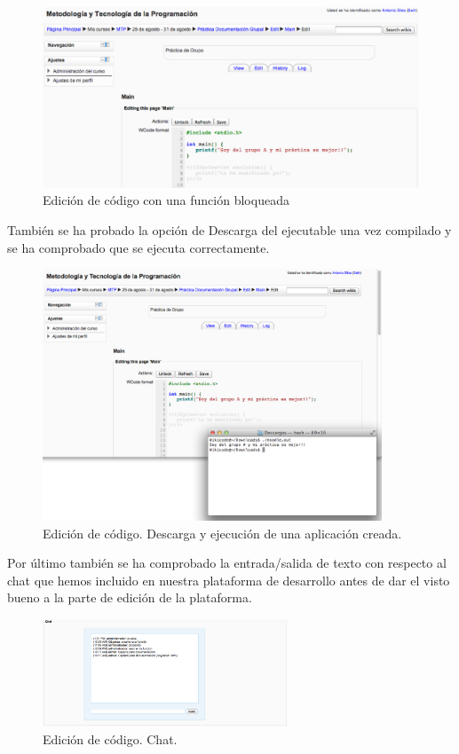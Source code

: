 \begin{figure}[h]
	\includegraphics[width=\textwidth]{./img/ej2edit4.eps}
	\caption{Edición de código con una función bloqueada}
\end{figure}

\newpage	
También se ha probado la opción de Descarga del ejecutable una vez compilado y se ha comprobado que se ejecuta correctamente.	
	
\begin{figure}[h]
	\centering
	\includegraphics[width=0.9\textwidth]{./img/download.eps}
	\caption{Edición de código. Descarga y ejecución de una aplicación creada.}
\end{figure}	

Por último también se ha comprobado la entrada/salida de texto con respecto al chat que hemos incluido en nuestra plataforma de desarrollo antes de dar el visto bueno a la parte de edición de la plataforma.

\begin{figure}[h]
	\centering
	\includegraphics[width=0.65\textwidth]{./img/echat.eps}
	\caption{Edición de código. Chat.}
\end{figure}

